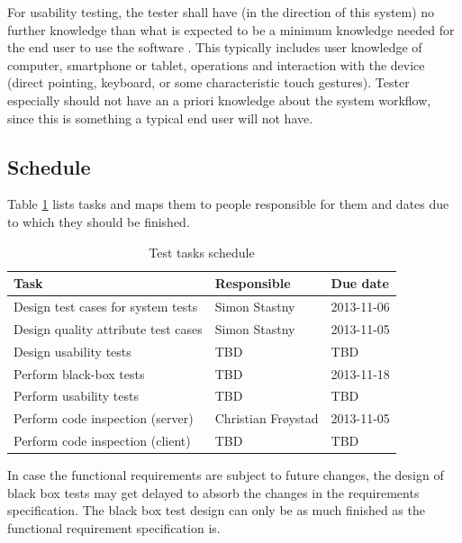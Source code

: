 \documentclass[11pt]{book}
\begin{document}
For usability testing, the tester shall have (in the direction of this system) no further knowledge than what is expected to be a minimum knowledge needed for the end user to use the software . This typically includes user knowledge of computer, smartphone or tablet, operations and interaction with the device (direct pointing, keyboard, or some characteristic touch gestures). Tester especially should not have an a priori knowledge about the system workflow, since this is something a typical end user will not have.
\subsection{Schedule}

Table \ref{tab:test_plan_schedule} lists tasks and maps them to people responsible for them and dates due to which they should be finished. 

\begin{table}[H]
    \centering
    \begin{tabular}{| l | l | l |}
        \hline
        Task                                & Responsible             & Due date       \\ \hline
        Design test cases for system tests  & Simon Stastny           & 2013-11-06     \\ \hline
        Design quality attribute test cases & Simon Stastny           & 2013-11-05     \\ \hline
        Design usability tests              & TBD                     & TBD            \\ \hline
        Perform black-box tests             & TBD                     & 2013-11-18     \\ \hline
        Perform usability tests             & TBD                     & TBD            \\ \hline
        Perform code inspection (server)    & Christian Frøystad      & 2013-11-05     \\ \hline
        Perform code inspection (client)    & TBD                     & TBD            \\ \hline
    \end{tabular}
    \caption{Test tasks schedule}
    \label{tab:test_plan_schedule}
\end{table}


In case the functional requirements are subject to future changes, the design of black box tests may get delayed to absorb the changes in the requirements specification. The black box test design can only be as much finished as the functional requirement specification is.
\end{document}
